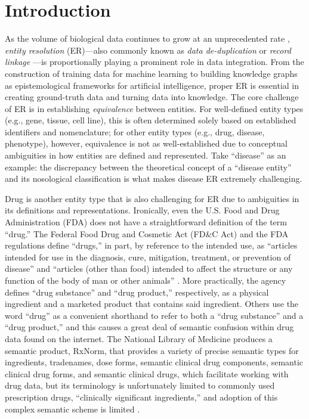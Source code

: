 \documentclass{bmcart}
\begin{document}
\section*{Introduction}
As the volume of biological data continues to grow at an unprecedented
rate \cite{Searls2005}, \emph{entity
resolution} (ER)---also commonly known as \emph{data de-duplication} or
\emph{record linkage} \cite{Fellegi1969}---is proportionally playing a
prominent role in data integration. From the construction of training
data for machine learning to building knowledge graphs as 
epistemological frameworks for artificial intelligence, proper ER 
is essential in creating ground-truth data and turning
data into knowledge. The core challenge of ER is in establishing
\emph{equivalence} between entities. For
well-defined entity types (e.g., gene, tissue, cell line), this
is often determined solely based on established identifiers and
nomenclature; for other entity types (e.g., drug, disease, phenotype),
however, equivalence is not as well-established due to conceptual
ambiguities in how entities are defined and represented. Take ``disease''
as an example: the discrepancy between the theoretical concept of a
``disease entity'' and its nosological classification
\cite{Hucklenbroich2014} is what makes disease ER extremely
challenging. 

Drug is another entity type that is also challenging for ER due to
ambiguities in its definitions and representations. Ironically, even the 
U.S. Food and Drug Administration (FDA) does not have a
straightforward definition of the term ``drug.'' The Federal Food Drug
and Cosmetic Act (FD\&C Act) and the FDA regulations define ``drugs,''
in part, by reference to the intended use, as ``articles intended for
use in the diagnosis, cure, mitigation, treatment, or prevention of
disease'' and ``articles (other than food) intended to affect the
structure or any function of the body of man or other
animals'' \cite{FDADrug}. More practically, the agency defines ``drug
substance'' and ``drug product,'' respectively, as a physical
ingredient and a marketed product that contains said ingredient. 
Others use the word ``drug'' as a convenient shorthand to refer 
to both a ``drug substance'' and a ``drug product,'' and this causes 
a great deal of semantic confusion within drug data found on the internet. 
The National Library of Medicine produces a semantic product, RxNorm, 
that provides a variety of precise semantic types for ingredients,
tradenames, dose forms, semantic clinical drug components, semantic
clinical drug forms, and semantic clinical drugs, which facilitate
working with drug data, but its terminology is unfortunately limited
to commonly used prescription  drugs, ``clinically significant
ingredients,'' and adoption of this complex semantic scheme is limited
\cite{RxNorm}.
\end{document}
